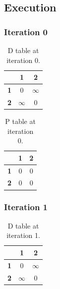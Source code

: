 \documentclass{article}
\begin{document}
\newpage
\tableofcontents
\newpage

\subsection{Execution}
\subsubsection{Iteration 0}
\begin{table}[!ht]
\begin{adjustwidth}{-3cm}{-3cm}
\centering
\begin{tabular}{c||c|c|}
\cline{2-3}
 & \cellcolor{gray90}\textbf{1} & \cellcolor{gray90}\textbf{2} \\
\hline\hline
\multicolumn{1}{|c||}{\cellcolor{gray90}\textbf{1}} & 0 & $\infty$ \\ \hline
\multicolumn{1}{|c||}{\cellcolor{gray90}\textbf{2}} & $\infty$ & 0 \\ \hline
\end{tabular}
\caption{D table at iteration 0.}
\end{adjustwidth}
\end{table}

\begin{table}[!ht]
\begin{adjustwidth}{-3cm}{-3cm}
\centering
\begin{tabular}{c||c|c|}
\cline{2-3}
 & \cellcolor{gray90}\textbf{1} & \cellcolor{gray90}\textbf{2} \\
\hline\hline
\multicolumn{1}{|c||}{\cellcolor{gray90}\textbf{1}} & 0 & 0 \\ \hline
\multicolumn{1}{|c||}{\cellcolor{gray90}\textbf{2}} & 0 & 0 \\ \hline
\end{tabular}
\caption{P table at iteration 0.}
\end{adjustwidth}
\end{table}

\clearpage
\subsubsection{Iteration 1}
\begin{table}[!ht]
\begin{adjustwidth}{-3cm}{-3cm}
\centering
\begin{tabular}{c||c|c|}
\cline{2-3}
 & \cellcolor{gray90}\textbf{1} & \cellcolor{gray90}\textbf{2} \\
\hline\hline
\multicolumn{1}{|c||}{\cellcolor{gray90}\textbf{1}} & 0 & $\infty$ \\ \hline
\multicolumn{1}{|c||}{\cellcolor{gray90}\textbf{2}} & $\infty$ & 0 \\ \hline
\end{tabular}
\caption{D table at iteration 1.}
\end{adjustwidth}
\end{table}
\end{document}
